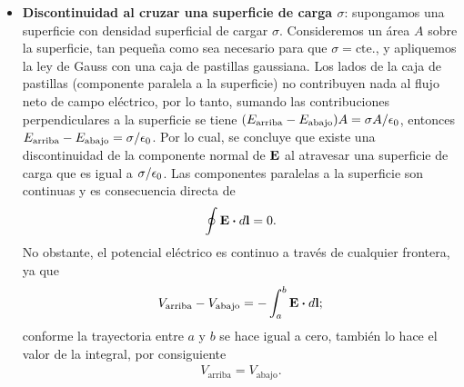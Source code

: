 \begin{itemize}
\item \textbf{Discontinuidad al cruzar una superficie de carga $\sigma$}:
supongamos una superficie con densidad superficial de cargar $\sigma$.
Consideremos un área $A$ sobre la superficie, tan pequeña como 
sea necesario para que $\sigma=\text{cte.}$, y apliquemos 
la ley de Gauss con una caja de pastillas gaussiana. Los lados 
de la caja de pastillas (componente paralela a la superficie) no 
contribuyen nada al flujo neto de campo eléctrico, por lo tanto, 
sumando las contribuciones perpendiculares a la superficie se 
tiene $\qty(E_{\text{arriba}}-E_{\text{abajo}})A=\sigma A/\epsilon_0$,
entonces $E_{\text{arriba}}-E_{\text{abajo}}=\sigma /\epsilon_0$. Por 
lo cual, se concluye que existe una discontinuidad de la componente 
normal de $\vb{E}$ al atravesar una superficie de carga que es igual 
a $\sigma/\epsilon_0$. Las componentes paralelas a la superficie son continuas
y es consecuencia directa de 
\begin{align}
\oint \vb{E}\vdot d\vb{l}=0.
\end{align}
No obstante, el potencial eléctrico es continuo a través de cualquier
frontera, ya que 
\begin{align*}
V_{\text{arriba}}-V_{\text{abajo}}=-\int_a^b\vb{E}\vdot d\vb{l};
\end{align*}
conforme la trayectoria entre $a$ y $b$ se hace igual a cero, 
también lo hace el valor de la integral, por consiguiente
\begin{align}
V_{\text{arriba}}=V_{\text{abajo}}.
\end{align}
\end{itemize}

